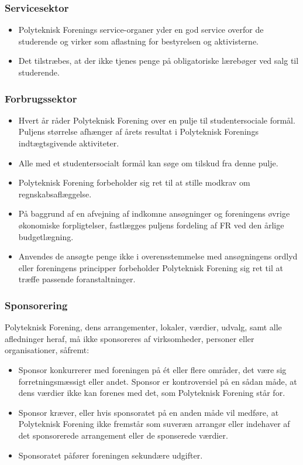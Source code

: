 \subsubsection{Servicesektor}
\begin{itemize}
\item Polyteknisk Forenings service-organer yder en god service overfor de studerende og virker som aflastning for bestyrelsen og aktivisterne.
\item Det tilstræbes, at der ikke tjenes penge på obligatoriske lærebøger ved salg til studerende.
\end{itemize}

\subsubsection{Forbrugssektor}
\begin{itemize}
\item  Hvert år råder Polyteknisk Forening over en pulje til studentersociale formål. Puljens størrelse afhænger af årets resultat i Polyteknisk Forenings indtægtsgivende aktiviteter.
\item Alle med et studentersocialt formål kan søge om tilskud fra denne pulje.
\item Polyteknisk Forening forbeholder sig ret til at stille modkrav om regnskabsaflæggelse.
\item På baggrund af en afvejning af indkomne ansøgninger og foreningens øvrige økonomiske forpligtelser, fastlægges puljens fordeling af FR ved den årlige budgetlægning.
\item Anvendes de ansøgte penge ikke i overensstemmelse med ansøgningens ordlyd eller foreningens principper forbeholder Polyteknisk Forening sig ret til at træffe passende foranstaltninger.
\end{itemize}

\subsubsection{Sponsorering}
Polyteknisk Forening, dens arrangementer, lokaler, værdier, udvalg, samt alle afledninger heraf, må ikke sponsoreres af virksomheder, personer eller organisationer, såfremt:
\begin{itemize}
\item Sponsor konkurrerer med foreningen på ét eller flere områder, det være sig forretningsmæssigt eller andet. Sponsor er kontroversiel på en sådan måde, at dens værdier ikke kan forenes med det, som Polyteknisk Forening står for.
\item Sponsor kræver, eller hvis sponsoratet på en anden måde vil medføre, at Polyteknisk Forening ikke fremstår som suveræn arrangør eller indehaver af det sponsorerede arrangement eller de sponserede værdier.
\item Sponsoratet påfører foreningen sekundære udgifter.
\end{itemize}

